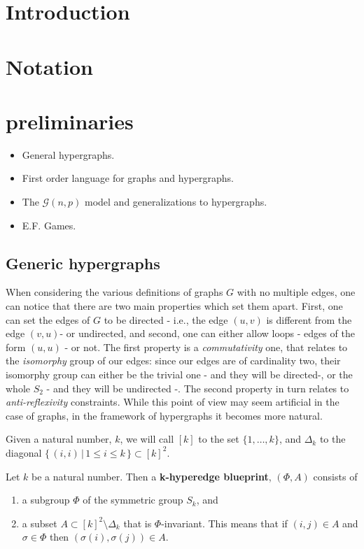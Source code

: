 \documentclass[oneside, 11pt, letterpaper]{report}
\begin{document}
\tableofcontents

\chapter*{Introduction}

\chapter*{Notation}

\chapter{preliminaries}

\begin{itemize}
	\item  General hypergraphs.
	\item First order language for graphs and hypergraphs.
	\item The $\mathcal{G}(n,p)$ model and generalizations to hypergraphs. 
	\item E.F. Games.
\end{itemize}


\section{Generic hypergraphs}

When considering the various definitions of graphs $G$ with no multiple edges,
one can notice that there are two main properties which set them apart. First, one can set 
the edges of $G$ to be directed - i.e., the edge $(u,v)$ is different from the edge $(v,u)$-
or undirected, and second, one can either allow loops - edges of the form $(u,u)$ - or not. 
The first property is a \textit{commutativity} one, that relates to the 
\textit{isomorphy} group of our edges: since our edges are of cardinality two, 
their isomorphy group can either be the trivial one - and they will be directed-, or the whole
$S_2$ - and they will be undirected -. The second property in turn relates to \textit{anti-reflexivity} constraints.
While this point of view may seem artificial in the case of graphs, in the framework of hypergraphs
it becomes more natural. \par
Given a natural number, $k$, we will call $[k]$ to the set $\{1,\dots, k\}$, and $\Delta_k$ to the
diagonal $\{ \, (i,i) \,  | \, 1\leq i \leq k \, \} \subset [k]^2$.

\begin{definition} Let $k$ be a natural number. Then a \textbf{k-hyperedge blueprint}, $(\Phi, A)$ 
consists of 
\begin{enumerate}
	\item a subgroup $\Phi$ of the symmetric group $S_k$, and
	\item a subset $A\subset [k]^2\setminus \Delta_k$ that is $\Phi$-invariant. 
	This means that if $(i,j)\in A$ and $\sigma \in \Phi$ then $(\sigma(i),\sigma(j))\in A$.
\end{enumerate} 
\end{definition}
\end{document}
